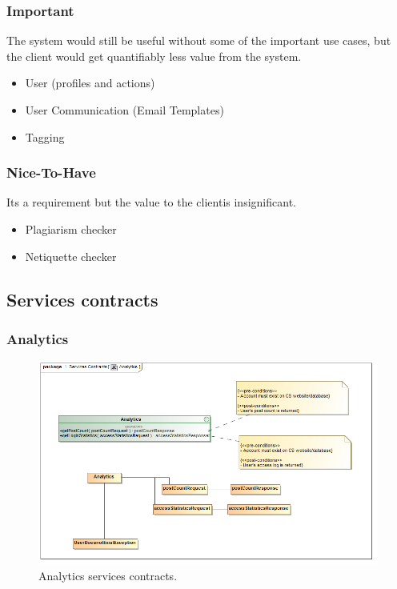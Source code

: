 \documentclass [a4paper,12pt] {article}
\begin{document}
	\subsubsection{Important}The system would still be useful without some of the important use cases, but the client would get quantifiably less value from the system.
		\begin{itemize}
			\item User (profiles and actions)
			\item User Communication (Email Templates)
			\item Tagging
		\end{itemize}
	\subsubsection{Nice-To-Have}Its a requirement but the value to the clientis insignificant.
		\begin{itemize}
			\item Plagiarism checker
			\item Netiquette checker
		\end{itemize}

\pagebreak
	\subsection{Services contracts}
		\subsubsection{Analytics}
			\begin{figure}[H]
				\centering
				\includegraphics[width=1.0\textwidth]{AnalyticsSC.png}
				\caption{Analytics services contracts.}
			\end{figure}
\end{document}

